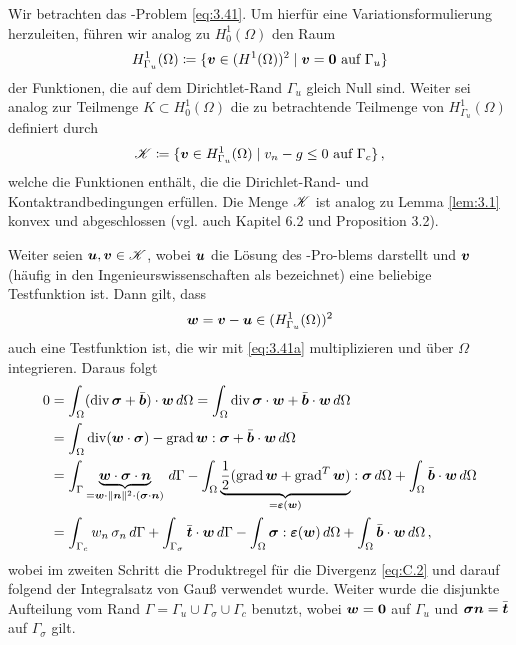 Wir betrachten das -Problem \eqref{eq:3.41}. Um hierfür eine Variationsformulierung herzuleiten, führen wir analog zu $H^1_0(\Omega)$ den Raum
\begin{align}\label{eq:my3.43}
	H^1_{\Gamma_u}(\Omega) \coloneqq \{\boldsymbol v \in (H^1(\Omega))^2 \mid \boldsymbol v = \boldsymbol 0 \text{ auf } \Gamma_u\}
\end{align}
der Funktionen, die auf dem  Dirichtlet-Rand $\Gamma_u$ gleich Null sind. Weiter sei analog zur Teilmenge $K \subset H^1_0(\Omega)$ die zu betrachtende Teilmenge von $H^1_{\Gamma_u}(\Omega)$ definiert durch
\begin{align}\label{eq:my3.44}
	\mathscr K \coloneqq \{\boldsymbol v \in H^1_{\Gamma_u}(\Omega) \mid v_n - g \le 0 \text{ auf } \Gamma_c\} \, ,
\end{align}
welche die Funktionen enthält, die die Dirichlet-Rand- und Kontaktrandbedingungen erfüllen. Die Menge $\mathscr K$ ist analog zu Lemma \ref{lem:3.1} konvex und abgeschlossen (vgl. auch \cite{KikOden} Kapitel 6.2 und \cite{CarWri} Proposition 3.2).


Weiter seien $\boldsymbol u, \boldsymbol v \in \mathscr K$, wobei $\boldsymbol u$ die Lösung des -Pro-blems darstellt und $\boldsymbol v$ (häufig in den Ingenieurswissenschaften als \textit{} bezeichnet) eine beliebige Testfunktion ist. Dann gilt, dass 
\[
	\boldsymbol w = \boldsymbol v - \boldsymbol u \in (H^1_{\Gamma_u}(\Omega))^2
\]
auch eine Testfunktion ist, die wir mit \eqref{eq:3.41a} multiplizieren und über $\Omega$ integrieren. Daraus folgt
\begin{align}\notag
	 0 & =  \int_\Omega (\operatorname{div} \boldsymbol\sigma + \bar{\boldsymbol b}) \cdot \boldsymbol w \, d \Omega = \int_\Omega \operatorname{div} \boldsymbol \sigma \cdot \boldsymbol w + \bar{\boldsymbol b} \cdot \boldsymbol w \, d\Omega \\
	 \notag
	& = \int_\Omega \operatorname{div}(\boldsymbol w \cdot \boldsymbol\sigma) - \operatorname{grad} \boldsymbol w : \boldsymbol \sigma + \bar{\boldsymbol b} \cdot \boldsymbol w \, d\Omega \\
	\notag
	& = \int_\Gamma \underbrace{\boldsymbol w \cdot \boldsymbol \sigma \cdot \boldsymbol n}_{=\boldsymbol w \cdot \lVert \boldsymbol n\rVert^2 \cdot (\boldsymbol \sigma \cdot \boldsymbol n)} \, d\Gamma - \int_\Omega \underbrace{\frac 1 2 (\operatorname{grad} \boldsymbol w + \operatorname{grad}^T \boldsymbol w)}_{= \boldsymbol {\varepsilon} (\boldsymbol w)} : \boldsymbol \sigma \, d\Omega + \int_\Omega \bar{\boldsymbol b} \cdot \boldsymbol w \, d \Omega \\
	\label{eq:3.43}
	& = \int_{\Gamma_c} w_n \, \sigma_n \, d \Gamma + \int_{\Gamma_\sigma} \bar{\boldsymbol t} \cdot \boldsymbol w \, d\Gamma-\int_\Omega \boldsymbol\sigma: \boldsymbol {\varepsilon}(\boldsymbol w) \, d\Omega + \int_\Omega \bar{\boldsymbol b} \cdot \boldsymbol w \, d\Omega \, ,
\end{align}
wobei im zweiten Schritt die Produktregel für die Divergenz \eqref{eq:C.2} und darauf folgend der Integralsatz von Gauß verwendet wurde. Weiter wurde die disjunkte Aufteilung vom Rand $\Gamma = \Gamma_u \cup \Gamma_\sigma \cup \Gamma_c$ benutzt, wobei $\boldsymbol w = \boldsymbol 0$ auf $\Gamma_u$ und $\boldsymbol \sigma \boldsymbol n = \bar{\boldsymbol t}$ auf $\Gamma_\sigma$ gilt.


